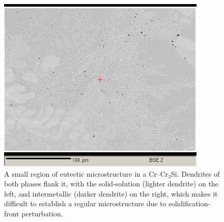 %
\begin{figure}[H]
\begin{center}
\includegraphics[width=10cm]{Cr100middle20umeutectic}
\caption{A small region of eutectic microstructure in a Cr--Cr$_3$Si.  Dendrites of both phases flank it,  with the solid-solution (lighter dendrite) on the left, and intermetallic (darker dendrite) on the right, which makes it difficult to establish a regular microstructure due to solidification-front perturbation.}
\label{fig:Cr100middle20umeutectic}
\end{center}
\end{figure}
%
%

